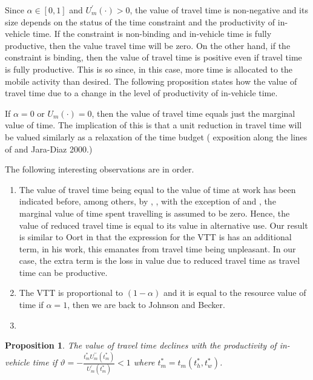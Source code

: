 \documentclass[12pt,a4paper,british]{article}
\newtheorem{prop}{Proposition}[section]
\begin{document}
Since $\alpha \in \left[0, 1 \right]$ and $U_{m}^{\prime}\left( \cdot \right) > 0$, the value of travel time is non-negative and its size depends on the status of the time constraint and the productivity of in-vehicle time. If the constraint is non-binding and in-vehicle time is fully productive, then the value travel time will be zero. On the other hand, if the constraint is binding, then the value of travel time is positive even if travel time is fully productive. This is so since, in this case, more time is allocated to the mobile activity than desired. The following proposition states how the value of travel time due to a change in the level of productivity of in-vehicle time. 

If $\alpha=0$ or $U_{m} \left( \cdot \right)=0$, then the value of travel time equals just the marginal value of time. The implication of this is that a unit reduction  in travel time will be valued similarly as a relaxation of the time budget ({\color{red} exposition along the lines of \citeauthor{Oort1969EvaluationTravellingTime} and Jara-Diaz 2000.}) 

The following interesting observations are in order.

\begin{enumerate}
\item The value of travel time being equal to the value of time at work has been indicated before, among others, by \citet{Becker1965TheoryAllocationTime}, \citet{Johnson1966TravelTimePrice}, with the exception of \citet{Oort1969EvaluationTravellingTime} and \cite{DeSerpa1971TheoryEconomicsTime}, the marginal value of time spent travelling is assumed to be zero. Hence, the value of reduced travel time is equal to its value in alternative use. Our result is similar to Oort in that the expression for the VTT is has an additional term, in his work, this emanates from travel time being unpleasant. In our case, the extra term is the loss in value due to reduced travel time as travel time can be productive. 
\item The VTT is proportional to $\left( 1 - \alpha \right)$ and it is equal to the resource value of time if  $\alpha=1$, then we are back to Johnson and Becker.
\item 
\end{enumerate}

\begin{prop}
The value of travel time declines with the productivity of in-vehicle time if $\vartheta = -\frac{t_{m}^{\ast} U_{m}^{\prime\prime} \left( t_{m}^{\ast} \right)} {U_{m}^{\prime}\left( t_{m}^{\ast} \right)}<1$ where $t_{m}^{\ast} = t_{m}\left(t_{h}^{\ast},t_{w}^{\ast}\right)$.
\end{prop}
\end{document}
